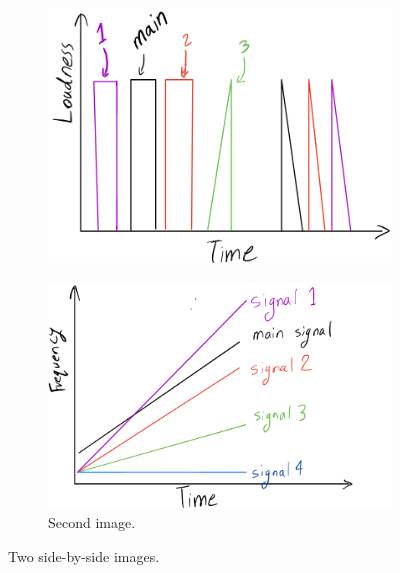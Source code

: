 \documentclass{article} %
\begin{document}
\begin{figure}[htbp]
    \centering
    \begin{subfigure}[b]{0.45\linewidth}
        \centering
        \includegraphics[width=\linewidth]{images/ood_motivation_time_alignment_doodle.png}
        \caption{}
        \label{fig:sub1}
    \end{subfigure}
    \hspace{0.05\linewidth}
    \begin{subfigure}[b]{0.45\linewidth}
        \centering
        \includegraphics[width=\linewidth]{images/ood_motivation_frequency_alignment_doodle.png}
        \caption{Second image.}
        \label{fig:sub2}
    \end{subfigure}
    \caption{Two side-by-side images.}
    \label{fig:twoside}
\end{figure}
\end{document}
